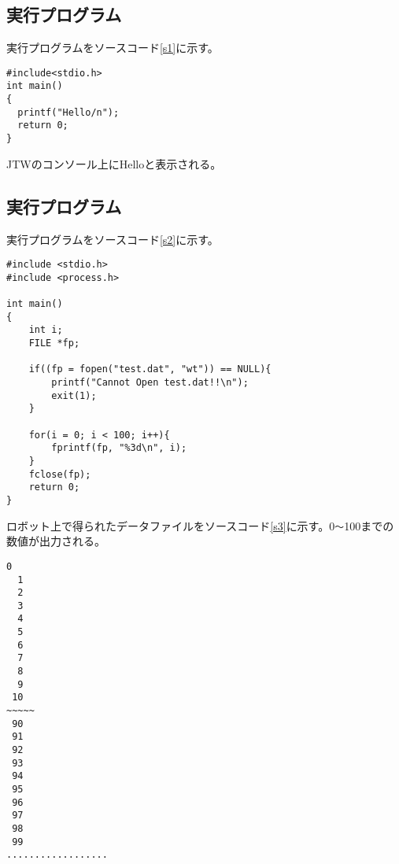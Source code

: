 \subsection{実行プログラム}
実行プログラムをソースコード\ref{s1}に示す。
\begin{lstlisting}[caption=演習1のプログラム,label=s1]
#include<stdio.h>
int main()
{
  printf("Hello/n");
  return 0;
}
\end{lstlisting}

JTWのコンソール上にHelloと表示される。
\subsection{実行プログラム}
実行プログラムをソースコード\ref{s2}に示す。
\begin{lstlisting}[caption=演習2のプログラム,label=s2]
#include <stdio.h>
#include <process.h>

int main()
{
	int i;
	FILE *fp;

	if((fp = fopen("test.dat", "wt")) == NULL){
		printf("Cannot Open test.dat!!\n");
		exit(1);
	}
	
	for(i = 0; i < 100; i++){
		fprintf(fp, "%3d\n", i);
	}
	fclose(fp);
	return 0;
}  
\end{lstlisting}

ロボット上で得られたデータファイルをソースコード\ref{s3}に示す。0\verb|～|100までの数値が出力される。
\begin{lstlisting}[caption=ロボット上で得られたデータファイル(TEST.DAT),label=s3]
  0
  1
  2
  3
  4
  5
  6
  7
  8
  9
 10
~~~~~
 90
 91
 92
 93
 94
 95
 96
 97
 98
 99
..................
\end{lstlisting}